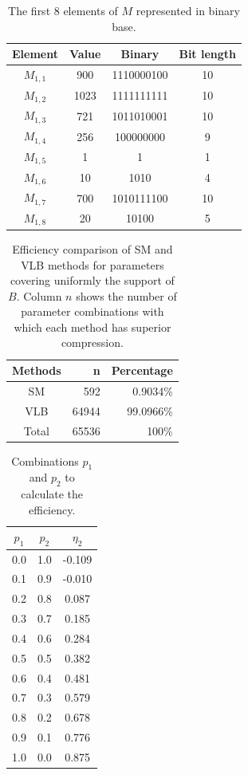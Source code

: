 \documentclass[10pt]{article}
\begin{document}
\begin{table}[h]
 \centering
 \caption{The first 8 elements of $M$ represented in binary base.}
 \begin{tabular}{cccc} 
  \hline 
  Element & Value  & Binary & Bit length\\
  \hline
  $M_{1,1}$ & 900  & 1110000100 & 10\\
  $M_{1,2}$ & 1023 & 1111111111 & 10\\
  $M_{1,3}$ & 721  & 1011010001 & 10\\
  $M_{1,4}$ & 256  & 100000000  & 9\\
  $M_{1,5}$ & 1    & 1          & 1\\
  $M_{1,6}$ & 10   & 1010       & 4\\
  $M_{1,7}$ & 700  & 1010111100 & 10\\
  $M_{1,8}$ & 20   & 10100      & 5\\
  \hline
 \end{tabular}
 \label{tab:01}
\end{table}

\begin{table}[h]
 \centering
 \caption{Efficiency comparison of SM and VLB methods for parameters covering 
uniformly the support of $B$. Column $n$ shows the number of parameter 
combinations with which each method has superior compression.}
 \begin{tabular}{crr}
  \hline 
  Methods  & n   & Percentage \\
  \hline
  SM	   & 592	& 0.9034\% \\
  VLB	   & 64944	& 99.0966\% \\
  \hline
  Total    & 65536	& 100\% \\
  \hline
 \end{tabular}
 \label{tab:02}
\end{table}

\begin{table}[h]
 \centering
 \caption{Combinations $p_1$ and $p_2$ to calculate the efficiency.}
 \begin{tabular}{ccc}
  \hline 
  $p_1$  & $p_2$ & $\eta_2$ \\
  \hline
  0.0	&1.0    &-0.109 \\
  0.1	&0.9	&-0.010 \\
  0.2	&0.8	&0.087 \\
  0.3	&0.7	&0.185 \\
  0.4	&0.6	&0.284 \\
  0.5	&0.5	&0.382 \\
  0.6	&0.4	&0.481 \\
  0.7	&0.3	&0.579 \\ 
  0.8	&0.2	&0.678 \\
  0.9	&0.1	&0.776 \\ 
  1.0	&0.0	&0.875 \\
  \hline
 \end{tabular}
 \label{tab:03}
\end{table}
\end{document}
